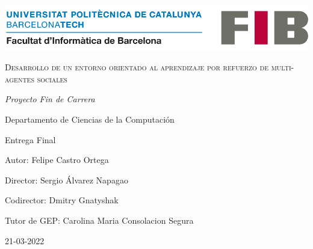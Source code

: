 \begin{titlepage}
\centering
{\includegraphics[width=1\textwidth]{img/logo-fib.png}\par}
\vspace{2.5cm}
{\scshape\Huge Desarrollo de un entorno orientado al aprendizaje por refuerzo de multi-agentes sociales \par}
\vspace{2.5cm}
{\itshape\Large Proyecto Fin de Carrera \par Departamento de Ciencias de la Computación \par Entrega Final \par}
\vfill
{\Large Autor: Felipe Castro Ortega \par}
{\Large Director: Sergio Álvarez Napagao \par}
{\Large Codirector: Dmitry Gnatyshak \par}
{\Large Tutor de GEP: Carolina Maria Consolacion Segura \par}
\vfill
{\Large 21-03-2022}
\end{titlepage}